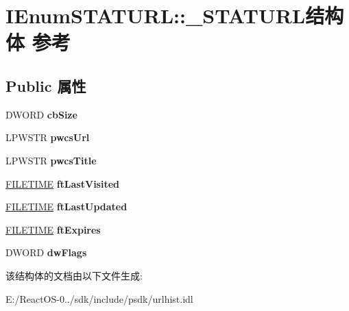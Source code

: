 \hypertarget{struct_i_enum_s_t_a_t_u_r_l_1_1___s_t_a_t_u_r_l}{}\section{I\+Enum\+S\+T\+A\+T\+U\+RL\+:\+:\+\_\+\+S\+T\+A\+T\+U\+R\+L结构体 参考}
\label{struct_i_enum_s_t_a_t_u_r_l_1_1___s_t_a_t_u_r_l}
\subsection*{Public 属性}
\begin{DoxyCompactItemize}
\item 
\mbox{\label{struct_i_enum_s_t_a_t_u_r_l_1_1___s_t_a_t_u_r_l_a69367dcdc24a8e24e80d7621d6967e55}} 
D\+W\+O\+RD {\bfseries cb\+Size}
\item 
\mbox{\label{struct_i_enum_s_t_a_t_u_r_l_1_1___s_t_a_t_u_r_l_abed99bbfc475aeb7c3db754acbab4278}} 
L\+P\+W\+S\+TR {\bfseries pwcs\+Url}
\item 
\mbox{\label{struct_i_enum_s_t_a_t_u_r_l_1_1___s_t_a_t_u_r_l_ac1a8357165be526bf112a52fa6c2fca1}} 
L\+P\+W\+S\+TR {\bfseries pwcs\+Title}
\item 
\mbox{\label{struct_i_enum_s_t_a_t_u_r_l_1_1___s_t_a_t_u_r_l_a6773f87769229f97f0b7bde7b7680679}} 
\hyperlink{struct___f_i_l_e_t_i_m_e}{F\+I\+L\+E\+T\+I\+ME} {\bfseries ft\+Last\+Visited}
\item 
\mbox{\label{struct_i_enum_s_t_a_t_u_r_l_1_1___s_t_a_t_u_r_l_a68f1d98b09ca5f50ae3bd12a9ec57600}} 
\hyperlink{struct___f_i_l_e_t_i_m_e}{F\+I\+L\+E\+T\+I\+ME} {\bfseries ft\+Last\+Updated}
\item 
\mbox{\label{struct_i_enum_s_t_a_t_u_r_l_1_1___s_t_a_t_u_r_l_aeab0c37804de16de9dafb9391a4dc610}} 
\hyperlink{struct___f_i_l_e_t_i_m_e}{F\+I\+L\+E\+T\+I\+ME} {\bfseries ft\+Expires}
\item 
\mbox{\label{struct_i_enum_s_t_a_t_u_r_l_1_1___s_t_a_t_u_r_l_a3c76d156b2585d6ee3d628a60231abcf}} 
D\+W\+O\+RD {\bfseries dw\+Flags}
\end{DoxyCompactItemize}


该结构体的文档由以下文件生成\+:\begin{DoxyCompactItemize}
\item 
E\+:/\+React\+O\+S-\/0../sdk/include/psdk/urlhist.\+idl\end{DoxyCompactItemize}
